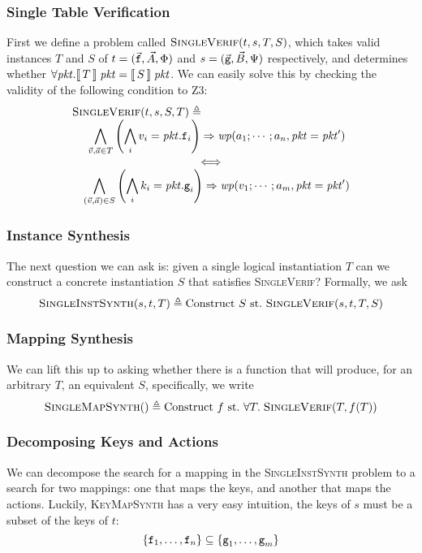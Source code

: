 \subsubsection{Single Table Verification}
First we define a problem called $\textsc{SingleVerif}(t,s,T, S)$,
which takes valid instances $T$ and $S$ of
$t = (\vec{\texttt{f}}, \vec A, \Phi)$ and
$s = (\vec{\texttt{g}}, \vec B, \Psi)$ respectively, and determines
whether $\forall \mathit{pkt}. \llbracket\,T\,\rrbracket\;\mathit{pkt} = \llbracket\,S\,\rrbracket\; \mathit{pkt}$. We can
easily solve this by checking the validity of the following condition
to Z3:
\[\begin{array}c
    \multicolumn{1}{l}{\textsc{SingleVerif}(t,s,S,T) \triangleq}\\
    \displaystyle \quad \bigwedge_{\vec v, \vec a \in T}
    \left(\bigwedge_i v_i = \pkt.\var f_i\right) \Rightarrow \wp(a_1;\cdots;a_n,\pkt = \pkt')\\ \iff \\
    \displaystyle \quad \bigwedge_{(\vec v, \vec a) \in S}\left(\bigwedge_i k_i = \pkt.\var g_i\right) \Rightarrow \wp(v_1;\cdots; a_m, \pkt= \pkt')
  \end{array}
\]

\subsubsection{Instance Synthesis}

The next question we can ask is: given a single logical instantiation
$T$ can we construct a concrete instantiation $S$ that satisfies
\textsc{SingleVerif}? Formally, we ask
\[\textsc{SingleInstSynth}(s,t,T) \triangleq \textrm{Construct}~S~\textrm{st.}~\textsc{SingleVerif}(s,t,T, S)\]

\subsubsection{Mapping Synthesis}

We can lift this up to asking whether there is a function that will
produce, for an arbitrary $T$, an equivalent $S$, specifically, we
write
\[\textsc{SingleMapSynth}() \triangleq \textrm{Construct}~f~\textrm{st.}~\forall T.\;
  \textsc{SingleVerif}(T, f(T))\]

\subsubsection{Decomposing Keys and Actions}

We can decompose the search for a mapping in the
\textsc{SingleInstSynth} problem to a search for two mappings: one
that maps the keys, and another that maps the actions. Luckily,
\textsc{KeyMapSynth} has a very easy intuition, the keys of $s$ must
be a subset of the keys of $t$:
\[\{\texttt{f}_1, \ldots, \texttt{f}_n\} \subseteq \{\texttt{g}_1, \ldots, \texttt{g}_m\}\]

